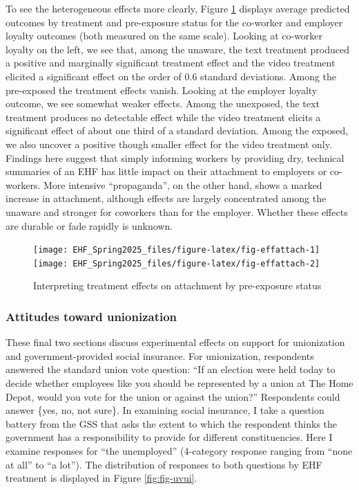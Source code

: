 \documentclass[
  11pt,
  oneside]{article}
\begin{document}
To see the heterogeneous effects more clearly, Figure \ref{fig:fig-effattach} displays average predicted outcomes by treatment and pre-exposure status for the co-worker and employer loyalty outcomes (both measured on the same scale). Looking at co-worker loyalty on the left, we see that, among the unaware, the text treatment produced a positive and marginally significant treatment effect and the video treatment elicited a significant effect on the order of 0.6 standard deviations. Among the pre-exposed the treatment effects vanish. Looking at the employer loyalty outcome, we see somewhat weaker effects. Among the unexposed, the text treatment produces no detectable effect while the video treatment elicits a significant effect of about one third of a standard deviation. Among the exposed, we also uncover a positive though smaller effect for the video treatment only. Findings here suggest that simply informing workers by providing dry, technical summaries of an EHF has little impact on their attachment to employers or co-workers. More intensive ``propaganda'', on the other hand, shows a marked increase in attachment, although effects are largely concentrated among the unaware and stronger for coworkers than for the employer. Whether these effects are durable or fade rapidly is unknown.

\begin{figure}
\texttt{[image: EHF\_Spring2025\_files/figure-latex/fig-effattach-1]} \texttt{[image: EHF\_Spring2025\_files/figure-latex/fig-effattach-2]} \caption{Interpreting treatment effects on attachment by pre-exposure status}\label{fig:fig-effattach}
\end{figure}

\subsubsection{Attitudes toward unionization}\label{attitudes-toward-unionization}

These final two sections discuss experimental effects on support for unionization and government-provided social insurance. For unionization, respondents answered the standard union vote question: ``If an election were held today to decide whether employees like you should be represented by a union at The Home Depot, would you vote for the union or against the union?'' Respondents could answer \{yes, no, not sure\}. In examining social insurance, I take a question battery from the GSS that asks the extent to which the respondent thinks the government has a responsibility to provide for different constituencies. Here I examine responses for ``the unemployed'' (4-category response ranging from ``none at all'' to ``a lot''). The distribution of responses to both questions by EHF treatment is displayed in Figure \ref{fig:fig-uvui}.
\end{document}

